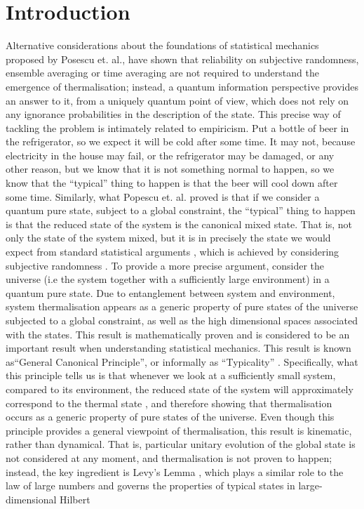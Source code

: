 
\chapter*{Introduction}

Alternative considerations about the foundations of statistical mechanics proposed by Posescu et. al.\cite{popescu_foundations_2005},  have shown that reliability on subjective randomness\cite{ma_statistical_1985}, ensemble averaging\cite{farquhar_ergodic_1965} or time averaging\cite{jancel_foundations_2013} are not required to understand the emergence of thermalisation; instead, a quantum information perspective\cite{horodecki_partial_2005} provides an answer to it, from a uniquely quantum point of view, which does not rely on any ignorance probabilities in the description of the state. This precise way of tackling the problem is intimately related to empiricism. Put a bottle of beer in the refrigerator, so we expect it will be cold after some time. It may not, because electricity in the house may fail, or the refrigerator may be damaged,  or any other reason, but we know that it is not something normal to happen, so we know that the ``typical'' thing to happen is that the beer will cool down after some time. Similarly, what Popescu et. al. proved is that if we consider a quantum pure state, subject to a global constraint, the ``typical'' thing to happen is that the reduced state of the system is the canonical mixed state. That is, not only the state of the system mixed, but it is in precisely the state we would expect from standard statistical arguments \cite{popescu_foundations_2005}, which is achieved by considering  subjective randomness \cite{deutsch_thermodynamic_2010,singh_foundations_2013}. To provide a more precise argument, consider the universe (i.e the system together with a sufficiently large environment) in a quantum pure state. Due to entanglement between system and environment, system thermalisation appears as a generic property of pure states of the universe subjected to a global constraint, as well as the high dimensional spaces associated with the states. This result is mathematically proven\cite{popescu_entanglement_2006} and is considered to be an important result when understanding statistical mechanics. This result is known as``General Canonical Principle'', or informally as ``Typicality'' . Specifically, what this principle tells us is that whenever we look at a sufficiently small system, compared to its environment, the reduced state of the system will approximately correspond to the thermal state \cite{popescu_foundations_2005,popescu_entanglement_2006,goldstein_canonical_2006,gemmer_quantum_2004}, and therefore showing that thermalisation occurs as a generic property of pure states of the universe. Even though this principle provides a general viewpoint of thermalisation, this result is kinematic, rather than dynamical. That is, particular unitary evolution of the global state is not considered at any moment, and thermalisation is not proven to happen; instead, the key ingredient is Levy's Lemma \cite{milman_asymptotic_2009,ledoux_concentration_2005}, which plays a similar role to the law of large numbers and governs the properties of typical states in large-dimensional Hilbert 
